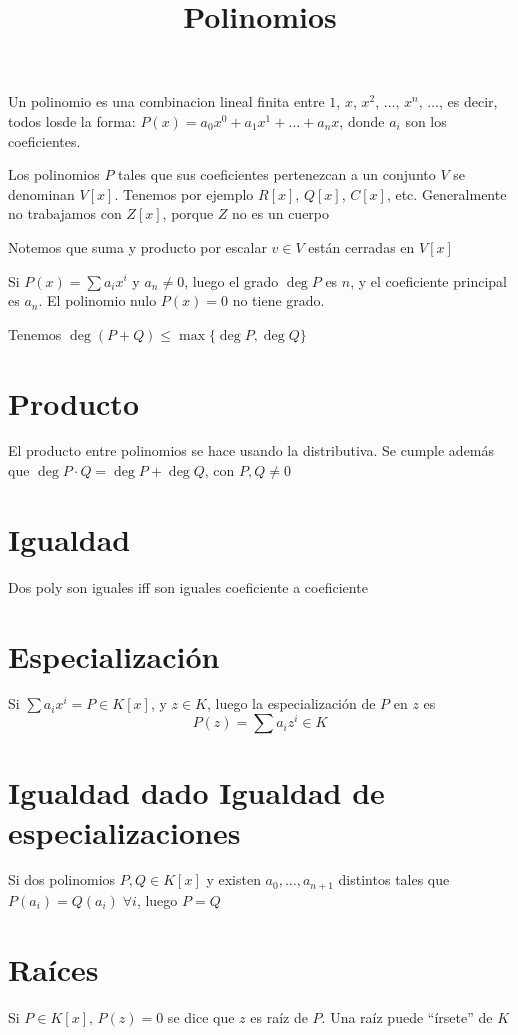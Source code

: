 \documentclass{article}
\title{Polinomios}
\date{}
\begin{document}
\maketitle
Un polinomio es una combinacion lineal finita entre $1$, $x$, $x^2$, $\dots$,
$x^n$, $\dots$, es decir, todos losde la forma:
\(
P(x) = a_0x^0 + a_1x^1 + \dots + a_nx
\), donde $a_i$ son los coeficientes.

Los polinomios $P$ tales que sus coeficientes pertenezcan a un conjunto $V$
se denominan $V[x]$. Tenemos por ejemplo $R[x]$, $Q[x]$, $C[x]$, etc.
Generalmente no trabajamos con $Z[x]$, porque $Z$ no es un cuerpo

Notemos que suma y producto por escalar $v \in V$ están cerradas en $V[x]$

Si $P(x) = \sum a_ix^i$ y $a_n \neq 0$, luego el grado $\deg P$ es $n$, y
el coeficiente principal es $a_n$. El polinomio nulo $P(x) = 0$ no tiene
grado.

Tenemos $\deg (P+Q) \leq \max \{\deg P, \deg Q\}$

\section{Producto}

El producto entre polinomios se hace usando la distributiva. Se cumple
además que $\deg P\cdot Q =\deg P + \deg Q$, con $P, Q \neq 0$

\section{Igualdad}

Dos poly son iguales iff son iguales coeficiente a coeficiente

\section{Especialización}
Si $\sum a_ix^i = P \in K[x]$, y $z \in K$, luego la especialización de $P$
en $z$ es \[P(z) = \sum a_iz^i \in K\]

\section{Igualdad dado Igualdad de especializaciones}
Si dos polinomios $P, Q\in K[x]$ y existen $a_0, \dots, a_{n+1}$ distintos
tales que $P(a_i) = Q(a_i) \; \forall i$, luego $P = Q$

\section{Raíces}
Si $P\in K[x]$, $P(z) = 0$ se dice que $z$ es raíz de $P$. Una raíz
puede ``írsete'' de $K$
\end{document}
